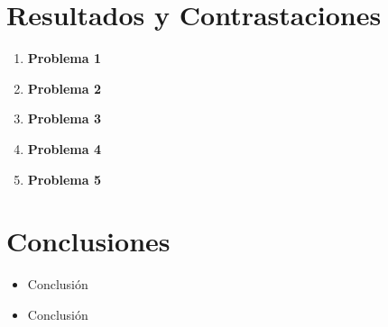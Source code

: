 \documentclass[letterpaper, titlepage]{article}
\begin{document}
\section{Resultados y Contrastaciones}
	\begin{enumerate}
		\item \textbf{Problema 1}
		
		\item \textbf{Problema 2}
		
		\item \textbf{Problema 3}
		
		\item \textbf{Problema 4}
		
		\item \textbf{Problema 5}
	\end{enumerate}
\newpage

\section{Conclusiones}
	\begin{itemize}
		\item Conclusión
		\item Conclusión
	\end{itemize}
\end{document}
